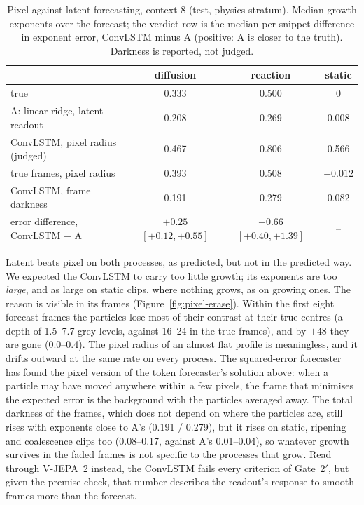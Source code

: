 \begin{table}[h]
  \centering
  \caption{Pixel against latent forecasting, context 8 (test, physics stratum). Median
    growth exponents over the forecast; the verdict row is the median per-snippet
    difference in exponent error, ConvLSTM minus A (positive: A is closer to the truth).
    Darkness is reported, not judged.}
  \label{tab:pixel}
  \small\setlength{\tabcolsep}{5pt}
  \begin{tabular}{lccc}
    \toprule
    & diffusion & reaction & static \\
    \midrule
    true & 0.333 & 0.500 & 0 \\
    A: linear ridge, latent readout & 0.208 & 0.269 & 0.008 \\
    ConvLSTM, pixel radius (judged) & 0.467 & 0.806 & 0.566 \\
    true frames, pixel radius & 0.393 & 0.508 & $-0.012$ \\
    ConvLSTM, frame darkness & 0.191 & 0.279 & 0.082 \\
    \midrule
    error difference, ConvLSTM $-$ A & $+0.25$ $[+0.12, +0.55]$ & $+0.66$ $[+0.40, +1.39]$ & -- \\
    \bottomrule
  \end{tabular}
\end{table}

Latent beats pixel on both processes, as predicted, but not in the predicted way. We
expected the ConvLSTM to carry too little growth; its exponents are too \emph{large},
and as large on static clips, where nothing grows, as on growing ones. The reason is
visible in its frames (Figure~\ref{fig:pixel-erase}). Within the first eight forecast
frames the particles lose most of their contrast at their true centres (a depth of 1.5--7.7
grey levels, against 16--24 in the true frames), and by $+48$ they are gone (0.0--0.4).
The pixel radius of an almost flat profile is meaningless, and it drifts outward at the
same rate on every process. The squared-error forecaster has found the pixel version of
the token forecaster's solution above: when a particle may have
moved anywhere within a few pixels, the frame that minimises the expected error is the
background with the particles averaged away. The total darkness of the frames, which
does not depend on where the particles are, still rises with exponents close to A's
(0.191 / 0.279), but it rises on static, ripening and coalescence clips too (0.08--0.17,
against A's 0.01--0.04), so whatever growth survives in the faded frames is not specific
to the processes that grow. Read through V-JEPA~2 instead, the ConvLSTM fails every
criterion of Gate~2$'$, but given the premise check, that number describes the readout's
response to smooth frames more than the forecast.

